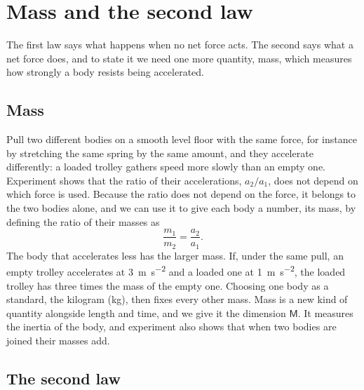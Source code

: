 \section{Mass and the second law}
\label{sec:ne-second}

The first law says what happens when no net force acts. The second says
what a net force does, and to state it we need one more quantity, mass,
which measures how strongly a body resists being accelerated.

\subsection*{Mass}

Pull two different bodies on a smooth level floor with the same force, for instance by stretching
the same spring by the same amount, and they accelerate differently: a
loaded trolley gathers speed more slowly than an empty one. Experiment
shows that the ratio of their accelerations, $a_2/a_1$, does not depend on
which force is used. Because the ratio does not depend on the force, it
belongs to the two bodies alone, and we can use it to give each body a
number, its mass, by defining the ratio of their masses as
\begin{equation*}
   \frac{m_1}{m_2} = \frac{a_2}{a_1} .
\end{equation*}
The body that accelerates less has the larger mass. If, under the same
pull, an empty trolley accelerates at \SI{3}{\metre\per\second\squared}
and a loaded one at \SI{1}{\metre\per\second\squared}, the loaded trolley
has three times the mass of the empty one. Choosing one body as a
standard, the kilogram (\si{\kilogram}), then fixes every other mass. Mass
is a new kind of quantity alongside length and time, and we give it the
dimension $\mathsf{M}$. It measures the inertia of the body, and
experiment also shows that when two bodies are joined their masses add.

\subsection*{The second law}

